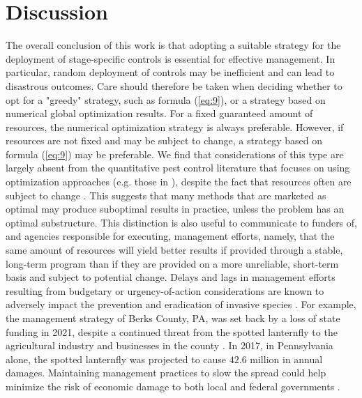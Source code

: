 \documentclass[onecolumn]{article}
\begin{document}
\section*{Discussion}
The overall conclusion of this work is that adopting a suitable strategy for the deployment of stage-specific controls is essential for effective management. In particular, random deployment of controls may be inefficient and can lead to disastrous outcomes. Care should therefore be taken when deciding whether to opt for a "greedy" strategy, such as formula (\ref{eq:9}), or a strategy based on numerical global optimization results. For a fixed guaranteed amount of resources, the numerical optimization strategy is always preferable. However, if resources are not fixed and may be subject to change, a strategy based on formula (\ref{eq:9}) may be preferable. We find that considerations of this type are largely absent from the quantitative pest control literature that focuses on using optimization approaches (e.g. those in \citep{Buyuktahtakin2018,Thompson2021}), despite the fact that resources often are subject to change \citep{Ahmed2022}. This suggests that many methods that are marketed as optimal may produce suboptimal results in practice, unless the problem has an optimal substructure. This distinction is also useful to communicate to funders of, and agencies responsible for executing, management efforts, namely, that the same amount of resources will yield better results if provided through a stable, long-term program than if they are provided on a more unreliable, short-term basis and subject to potential change. Delays and lags in management efforts resulting from budgetary or urgency-of-action considerations are known to adversely impact the prevention and eradication of invasive species \citep{Ahmed2022}. For example, the management strategy of Berks County, PA, was set back by a loss of state funding in 2021, despite a continued threat from the spotted lanternfly to the agricultural industry and businesses in the county \citep{Scheid2021}. In 2017, in Pennsylvania alone, the spotted lanternfly was projected to cause $42.6$ million in annual damages. Maintaining management practices to slow the spread could help minimize the risk of economic damage to both local and federal governments \citep{Harper2019}.
\end{document}
